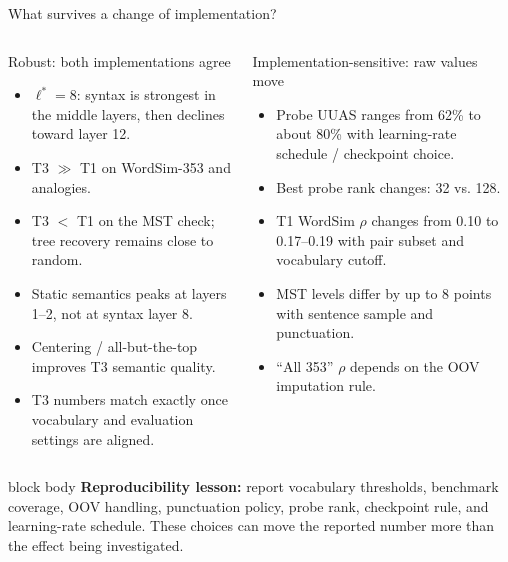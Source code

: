 \documentclass[aspectratio=169,9pt,t]{beamer}
\newcommand{\tightitem}{\setlength{\itemsep}{0.12em}\setlength{\parskip}{0pt}\setlength{\topsep}{0.08em}}
\newcommand{\lstar}{\ensuremath{\ell^*}}
\begin{document}
\begin{frame}{What survives a change of implementation?}
\begin{columns}[T,onlytextwidth]
\begin{exampleblock}{Robust: both implementations agree}
\begin{itemize}\tightitem
\item $\lstar=8$: syntax is strongest in the middle layers, then declines toward layer 12.
\item T3 $\gg$ T1 on WordSim-353 and analogies.
\item T3 $<$ T1 on the MST check; tree recovery remains close to random.
\item Static semantics peaks at layers 1--2, not at syntax layer 8.
\item Centering / all-but-the-top improves T3 semantic quality.
\item T3 numbers match exactly once vocabulary and evaluation settings are aligned.
\end{itemize}
\end{exampleblock}
\begin{alertblock}{Implementation-sensitive: raw values move}
\begin{itemize}\tightitem
\item Probe UUAS ranges from 62\% to about 80\% with learning-rate schedule / checkpoint choice.
\item Best probe rank changes: 32 vs. 128.
\item T1 WordSim $\rho$ changes from 0.10 to 0.17--0.19 with pair subset and vocabulary cutoff.
\item MST levels differ by up to 8 points with sentence sample and punctuation.
\item ``All 353'' $\rho$ depends on the OOV imputation rule.
\end{itemize}
\end{alertblock}
\end{columns}
\vspace{0.03em}
\begin{beamercolorbox}[rounded=true,sep=0.4ex,wd=\linewidth]{block body}
\textbf{Reproducibility lesson:} report vocabulary thresholds, benchmark coverage, OOV handling, punctuation policy, probe rank, checkpoint rule, and learning-rate schedule. These choices can move the reported number more than the effect being investigated.
\end{beamercolorbox}
\end{frame}
\end{document}
